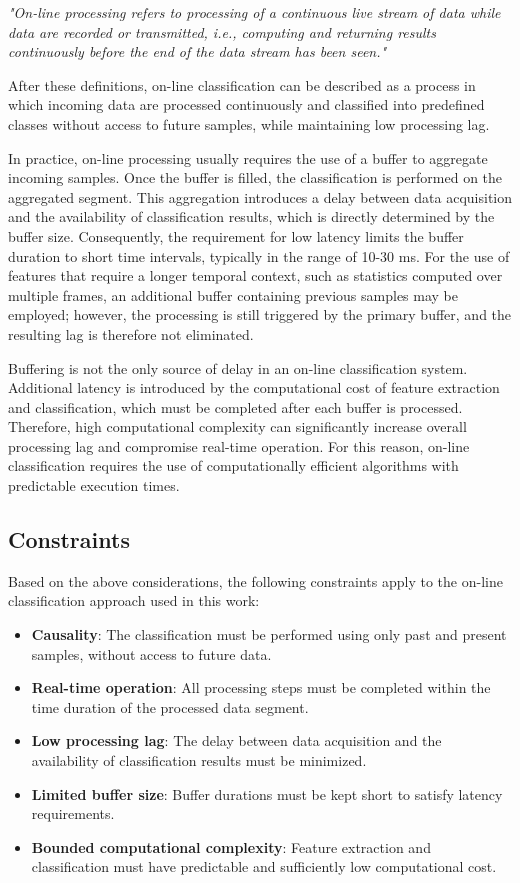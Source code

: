 \textit{"On-line processing refers to processing of a continuous live stream of data while data are recorded or transmitted, i.e., computing and returning results continuously before the end of the data stream has been seen."}

After these definitions, on-line classification can be described as a process in which incoming data are processed continuously and classified into predefined classes without access to future samples, while maintaining low processing lag.

In practice, on-line processing usually requires the use of a buffer to aggregate incoming samples.
Once the buffer is filled, the classification is performed on the aggregated segment.
This aggregation introduces a delay between data acquisition and the availability of classification results, which is directly determined by the buffer size.
Consequently, the requirement for low latency limits the buffer duration to short time intervals, typically in the range of 10-30 ms.
For the use of features that require a longer temporal context, such as statistics computed over multiple frames, an additional buffer containing previous samples may be employed; however, the processing is still triggered by the primary buffer, and the resulting lag is therefore not eliminated.

Buffering is not the only source of delay in an on-line classification system.
Additional latency is introduced by the computational cost of feature extraction and classification, which must be completed after each buffer is processed.
Therefore, high computational complexity can significantly increase overall processing lag and compromise real-time operation.
For this reason, on-line classification requires the use of computationally efficient algorithms with predictable execution times.

\subsection{Constraints}
\label{subsec:constraints}
Based on the above considerations, the following constraints apply to the on-line classification approach used in this work:
\begin{itemize}
    \item \textbf{Causality}: The classification must be performed using only past and present samples, without access to future data.
    \item \textbf{Real-time operation}: All processing steps must be completed within the time duration of the processed data segment.
    \item \textbf{Low processing lag}: The delay between data acquisition and the availability of classification results must be minimized.
    \item \textbf{Limited buffer size}: Buffer durations must be kept short to satisfy latency requirements.
    \item \textbf{Bounded computational complexity}: Feature extraction and classification must have predictable and sufficiently low computational cost.
\end{itemize}


